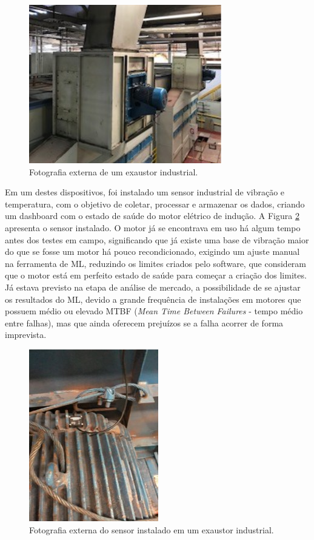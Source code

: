 \begin{figure}[H]
    \caption{Fotografia externa de um exaustor industrial.}
    \begin{center}
        \includegraphics[scale=1.25]{metodologia/img/exaustor.png}
    \end{center}
    \label{fig:exautor}
\end{figure}

Em um destes dispositivos, foi instalado um sensor industrial de vibração e temperatura, com o objetivo de coletar, processar e armazenar os
dados, criando um dashboard com o estado de saúde do motor elétrico de indução. A Figura \ref{fig:sensor_exaustor} apresenta o sensor instalado.
O motor já se encontrava em uso há algum tempo antes dos testes em campo, significando que já existe uma base de vibração maior do que se fosse
um motor há pouco recondicionado, exigindo um ajuste manual na ferramenta de ML, reduzindo os limites criados pelo software, que
consideram que o motor está em perfeito estado de saúde para começar a criação dos limites. Já estava previsto na etapa de análise de mercado, 
a possibilidade de se ajustar os resultados do ML, devido a grande frequência de instalações em motores que possuem médio ou
elevado MTBF (\textit{Mean Time Between Failures} - tempo médio entre falhas), mas que ainda oferecem prejuízos se a falha acorrer de forma 
imprevista.

\begin{figure}[H]
    \caption{Fotografia externa do sensor instalado em um exaustor industrial.}
    \begin{center}
        \includegraphics[scale=1.1]{metodologia/img/sensor_exaustor.jpg}
    \end{center}
    \label{fig:sensor_exaustor}
\end{figure}

